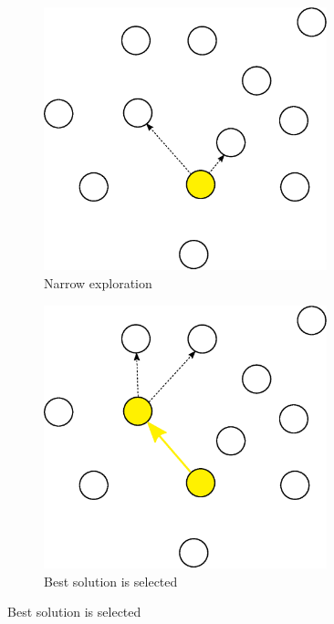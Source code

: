 \documentclass[english,a4paper,twoside]{ppfcmthesis}
\begin{document}
\begin{figure}
  \centering

  \begin{subfigure}{0.3\textwidth}
    \centering
    \includegraphics[width=0.9\textwidth]{algorithm/metaheuristic/dfs1.eps}
    \caption{Narrow exploration}
  \end{subfigure}
  \begin{subfigure}{0.3\textwidth}
    \centering
    \includegraphics[width=0.9\textwidth]{algorithm/metaheuristic/dfs2.eps}
    \caption{Best solution is selected}

\end{subfigure}
\end{figure}
\end{document}

